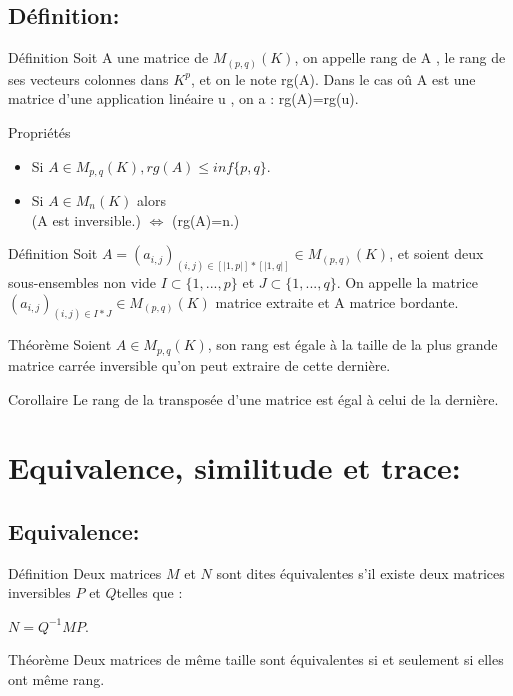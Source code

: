 \documentclass{book}
\begin{document}
\subsection{Définition: }
\begin{Définition}[]{Définition}{}
Soit A une matrice de \(M_{(p,q)}(K)\), on appelle rang de A , le rang de ses vecteurs colonnes dans \(K^p\), et on le note rg(A).
Dans le cas oû A est une matrice d'une application linéaire u , on a : rg(A)=rg(u).
\end{Définition}
\begin{Propriété}[]{Propriétés}{}
\begin{itemize}
    \item Si \(A \in M_{p,q}(K), rg(A) \leq inf\)\(\{p,q\}.\)
    \item Si \(A \in M_{n}(K)\) alors 
    \\ (A est inversible.) \(\Leftrightarrow\) (rg(A)=n.)
\end{itemize}
\end{Propriété}
\begin{Définition}[]{Définition}{}
Soit \(A=(a_{i,j})_{(i,j) \in [|1,p|]*[|1,q|] } \in M_{(p,q)}(K)\), et soient deux sous-ensembles non vide \(I \subset \{1,...,p\}\) et \(J \subset \{1,...,q\}\).
On appelle la matrice \((a_{i,j})_{(i,j) \in I*J} \in M_{(p,q)}(K)\) matrice extraite et A matrice bordante.
\end{Définition}
\begin{Théorème}[]{Théorème}{}
Soient \(A \in M_{p,q}(K)\), son rang est égale à la taille de la plus grande matrice carrée inversible qu'on peut extraire de cette dernière.
\end{Théorème}
\begin{Propriété}[]{Corollaire}{}
Le rang de la transposée d'une matrice est égal à celui de la dernière.
\end{Propriété}
\section{Equivalence, similitude et trace: }
\subsection{Equivalence:}
\begin{Définition}[]{Définition}{}
Deux matrices ${\displaystyle M}$ et ${\displaystyle N}$ sont dites équivalentes s'il existe deux matrices inversibles ${\displaystyle P}$ et ${\displaystyle Q} $telles que :

${\displaystyle N=Q^{-1}MP}$.
\end{Définition}
\begin{Théorème}[]{Théorème}{}
Deux matrices de même taille sont équivalentes si et seulement si elles ont même rang.
\end{Théorème}
\end{document}
